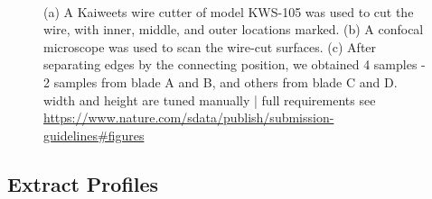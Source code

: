 \documentclass[fleqn,10pt]{wlscirep}
\newcommand{\tom}[1]{{\textcolor{RedOrange}{#1}}}
\begin{document}
\begin{figure}
\begin{minipage}{0.30\linewidth}
\end{minipage}%
%
\begin{minipage}{0.05\linewidth}
~\end{minipage}%
%
\begin{minipage}{0.65\linewidth}


\subcaption{\label{fig-T1AW-LI-R2-4edges}}

\end{minipage}%

\caption{\label{fig-cut-tent-scan}(a) A Kaiweets wire cutter of model
KWS-105 was used to cut the wire, with inner, middle, and outer
locations marked. (b) A confocal microscope was used to scan the
wire-cut surfaces. (c) After separating edges by the connecting
position, we obtained 4 samples - 2 samples from blade A and B, and
others from blade C and D. \tom{width and height are tuned manually}
\tom{ | full requirements see \href{https://www.nature.com/sdata/publish/submission-guidelines\#figures}{https://www.nature.com/sdata/publish/submission-guidelines\#figures}}}

\end{figure}%

\subsection*{Extract Profiles}\label{sec-extract-profiles}
\end{document}
